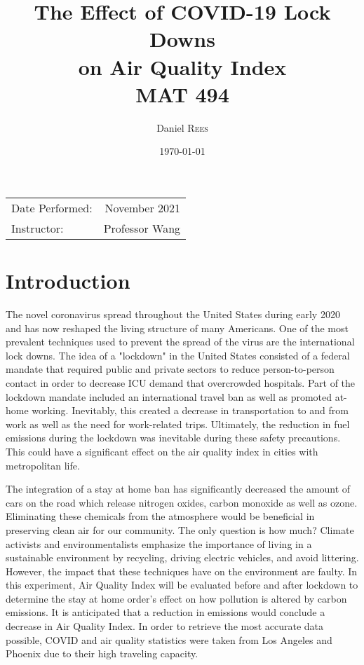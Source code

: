 \documentclass{article}
\title{The Effect of COVID-19 Lock Downs \\on Air Quality Index \\ MAT 494} %
\author{Daniel \textsc{Rees}}
\date{\today}
\begin{document}
\maketitle 

\begin{center}
\begin{tabular}{l r}
Date Performed: & November 2021 \\ 
Instructor: & Professor Wang 
\end{tabular}
\end{center}


\section{Introduction}
\begin{doublespacing}

The novel coronavirus spread throughout the United States during early 2020 and has now reshaped the living structure of many Americans. One of the most prevalent techniques used to prevent the spread of the virus are the international lock downs. The idea of a "lockdown" in the United States consisted of a federal mandate that required public and private sectors to reduce person-to-person contact in order to decrease ICU demand that overcrowded hospitals. Part of the lockdown mandate included an international travel ban as well as promoted at-home working. Inevitably, this created a decrease in transportation to and from work as well as the need for work-related trips. Ultimately, the reduction in fuel emissions during the lockdown was inevitable during these safety precautions. This could have a significant effect on the air quality index in cities with metropolitan life.

The integration of a stay at home ban has significantly decreased the amount of cars on the road which release nitrogen oxides, carbon monoxide as well as ozone. Eliminating these chemicals from the atmosphere would be beneficial in preserving clean air for our community. The only question is how much? Climate activists and environmentalists emphasize the importance of living in a sustainable environment by recycling, driving electric vehicles, and avoid littering. However, the impact that these techniques have on the environment are faulty. In this experiment, Air Quality Index will be evaluated before and after lockdown to determine the stay at home order's effect on how pollution is altered by carbon emissions. It is anticipated that a reduction in emissions would conclude a decrease in Air Quality Index. In order to retrieve the most accurate data possible, COVID and air quality statistics were taken from Los Angeles and Phoenix due to their high traveling capacity.



\end{doublespacing}
\end{document}
